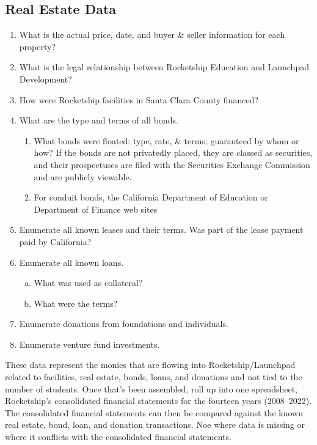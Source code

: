 \subsection{Real Estate Data}\label{sec:real-estate-data}\indent
\begin{enumerate}
  \item What is the actual price, date, and buyer \& seller information for each property?
  \item What is the legal relationship between Rocketship Education and Launchpad Development?
  \item How were Rocketship facilities in Santa Clara County financed?
  \item What are the type and terms of all bonds.
  \begin{enumerate}
    \item What bonds were floated: type, rate, \& terms; guaranteed by whom or how? If the bonds are not privatedly placed, they are classed as securities, and their prospectuses are filed with the Securities Exchange Commission and are publicly viewable.
    \item For conduit bonds, the California Department of Education or Department of Finance web sites 
  \end{enumerate}
  \item Enumerate all known leases and their terms. Was part of the lease payment paid by California?
  \item Enumerate all known loans.
  \begin{enumerate}[a.]
    \item What was used as collateral? 
    \item What were the terms?
  \end{enumerate}    
  \item Enumerate donations from foundations and individuals.
  \item Enumerate venture fund investments.
\end{enumerate}

These data represent the monies that are flowing into Rocketship/Launchpad related to facilities, real estate, bonds, loans, and donations and not tied to the number of students. Once that's been assembled, roll up into one spreadsheet, Rocketship's consolidated financial statements for the fourteen years (2008--2022). The consolidated financial statements can then be compared against the known real estate, bond, loan, and donation transactions. Noe where data is missing or where it conflicts with the consolidated financial statements.

